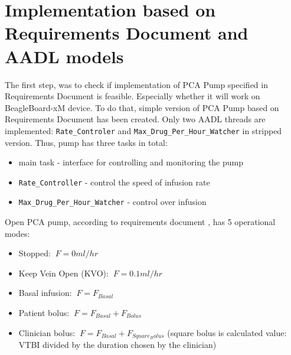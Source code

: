 \section{Implementation based on Requirements Document and AADL models}
\label{pcapumpimpl:manual}

The first step, was to check if implementation of PCA Pump specified in Requirements Document is feasible. Especially whether it will work on BeagleBoard-xM device. To do that, simple version of PCA Pump based on Requirements Document has been created. Only two AADL threads are implemented: \lstinline{Rate_Controler} and \lstinline{Max_Drug_Per_Hour_Watcher} in stripped version. Thus, pump has three tasks in total:
\begin{itemize}
    \item main task - interface for controlling and monitoring the pump
    \item \lstinline{Rate_Controller} - control the speed of infusion rate
    \item \lstinline{Max_Drug_Per_Hour_Watcher} - control over infusion
\end{itemize}

Open PCA pump, according to requirements document \cite{PcaReq}, has 5 operational modes:
\begin{itemize}
	\item Stopped: $\displaystyle\ F = 0 ml/hr$
	\item Keep Vein Open (KVO): $\displaystyle\ F = 0.1 ml/hr$
	\item Basal infusion: $\displaystyle\ F = F_{Basal}$
	\item Patient bolus: $\displaystyle\ F = F_{Basal} + F_{Bolus}$
	\item Clinician bolus: $\displaystyle\ F = F_{Basal} + F_{Square_Bolus}$ (square bolus is calculated value: VTBI divided by the duration chosen by the clinician)
\end{itemize}

